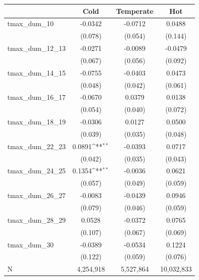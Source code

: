 {
\def\sym#1{\ifmmode^{#1}\else\(^{#1}\)\fi}
\begin{tabular}{l*{3}{c}}
\toprule
            &\multicolumn{1}{c}{Cold}&\multicolumn{1}{c}{Temperate}&\multicolumn{1}{c}{Hot}\\
\midrule
tmax\_dum\_10 &     -0.0342         &     -0.0712         &      0.0488         \\
            &     (0.078)         &     (0.054)         &     (0.144)         \\
tmax\_dum\_12\_13&     -0.0271         &     -0.0089         &     -0.0479         \\
            &     (0.067)         &     (0.056)         &     (0.092)         \\
tmax\_dum\_14\_15&     -0.0755         &     -0.0403         &      0.0473         \\
            &     (0.048)         &     (0.042)         &     (0.061)         \\
tmax\_dum\_16\_17&     -0.0670         &      0.0379         &      0.0138         \\
            &     (0.054)         &     (0.040)         &     (0.072)         \\
tmax\_dum\_18\_19&     -0.0306         &      0.0127         &      0.0500         \\
            &     (0.039)         &     (0.035)         &     (0.048)         \\
tmax\_dum\_22\_23&      0.0891\sym{**} &     -0.0393         &      0.0717         \\
            &     (0.042)         &     (0.035)         &     (0.043)         \\
tmax\_dum\_24\_25&      0.1354\sym{**} &     -0.0036         &      0.0621         \\
            &     (0.057)         &     (0.049)         &     (0.059)         \\
tmax\_dum\_26\_27&     -0.0083         &     -0.0439         &      0.0946         \\
            &     (0.079)         &     (0.046)         &     (0.059)         \\
tmax\_dum\_28\_29&      0.0528         &     -0.0372         &      0.0765         \\
            &     (0.107)         &     (0.067)         &     (0.069)         \\
tmax\_dum\_30 &     -0.0389         &     -0.0534         &      0.1224         \\
            &     (0.122)         &     (0.059)         &     (0.076)         \\
\midrule
N           &   4,254,918         &   5,527,864         &    10,032,833         \\

\bottomrule
\end{tabular}
}
